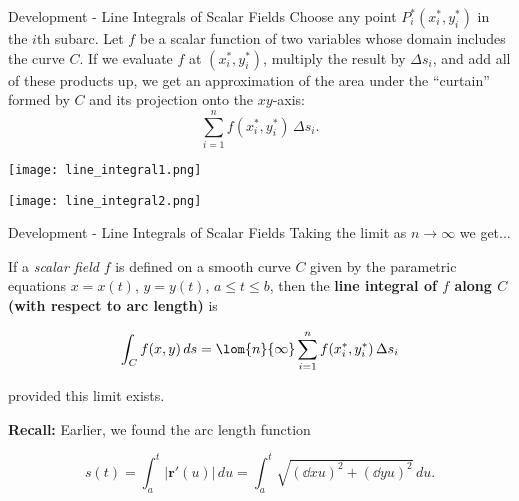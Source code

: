 \documentclass[11pt,english,
handout
]{beamer}
\begin{document}
\begin{frame}[t]{Development - Line Integrals of Scalar Fields}
\small
Choose any point $P_i^*(x_i^*,y_i^*)$ in the $i$th subarc. Let $f$ be a scalar function of two variables whose domain includes the curve $C$. If we evaluate $f$ at $(x_i^*,y_i^*)$, multiply the result by $\Delta s_i$, and add all of these products up, we get an approximation of the area under the ``curtain'' formed by $C$ and its projection onto the $xy$-axis:
\[
\sum_{i=1}^nf(x_i^*,y_i^*)\,\Delta s_i.
\]
\begin{minipage}{0.5\textwidth}
\begin{center}
\texttt{[image: line\_integral1.png]}
\end{center}
\end{minipage}%
\begin{minipage}{0.5\textwidth}
\begin{center}
\texttt{[image: line\_integral2.png]}
\end{center}
\end{minipage}
\end{frame}










\begin{frame}[t]{Development - Line Integrals of Scalar Fields}
\small
Taking the limit as $n\rightarrow \infty$ we get...\pause 

\lspace
\begin{definition}
If a \textit{scalar field} $f$ is defined on a smooth curve $C$ given by the parametric equations $x=x(t)$, $y=y(t)$, $a\leq t\leq b$, then the \textbf{line integral of $f$ along $C$ (with respect to arc length)} is 

\[
\int_Cf(x,y)\,ds=\lom{n}{\infty}\sum_{i=1}^nf(x_i^*,y_i^*)\,\Delta s_i
\]

provided this limit exists.
\end{definition}\pause

\textbf{Recall:} Earlier, we found the arc length function 

\[
s(t)=\int_a^t|\mathbf{r}'(u)|\,du=\int_a^t\sqrt{\left(\dd{x}{u}\right)^2+\left(\dd{y}{u}\right)^2}\,du.
\]
\end{frame}
\end{document}
